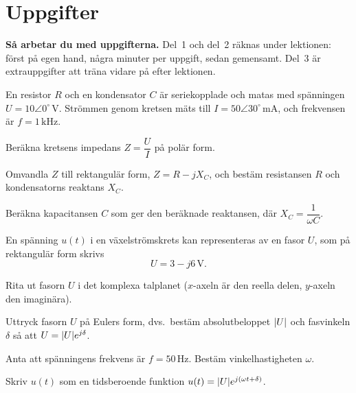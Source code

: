 
\section{Uppgifter}
\label{c17:sec:uppgifter}

\begin{aside}
\textbf{Så arbetar du med uppgifterna.} Del~1 och del~2 räknas under lektionen: först på egen
hand, några minuter per uppgift, sedan gemensamt. Del~3 är extrauppgifter att träna vidare på
efter lektionen.

\end{aside}


En resistor $R$ och en kondensator $C$ är seriekopplade och matas med spänningen
$U = 10\angle 0^{\circ}\,\text{V}$. Strömmen genom kretsen mäts till
$I = 50\angle 30^{\circ}\,\text{mA}$, och frekvensen är $f = 1\,\text{kHz}$.
\begin{parts}
  \item Beräkna kretsens impedans $Z = \dfrac{U}{I}$ på polär form.
  \item Omvandla $Z$ till rektangulär form, $Z = R - jX_C$, och bestäm resistansen $R$ och
    kondensatorns reaktans $X_C$.
  \item Beräkna kapacitansen $C$ som ger den beräknade reaktansen, där $X_C = \dfrac{1}{\omega C}$.
\end{parts}

En spänning $u(t)$ i en växelströmskrets kan representeras av en fasor $U$, som på rektangulär
form skrivs
\[
  U = 3 - j6\,\text{V}.
\]
\begin{parts}
  \item Rita ut fasorn $U$ i det komplexa talplanet ($x$-axeln är den reella delen, $y$-axeln den
    imaginära).
  \item Uttryck fasorn $U$ på Eulers form, dvs.\ bestäm absolutbeloppet $\lvert U\rvert$ och fasvinkeln
    $\delta$ så att $U = \lvert U\rvert e^{j\delta}$.
  \item Anta att spänningens frekvens är $f = 50\,\text{Hz}$. Bestäm vinkelhastigheten $\omega$.
  \item Skriv $u(t)$ som en tidsberoende funktion $u(t) = \lvert U\rvert e^{j(\omega t + \delta)}$.
\end{parts}

